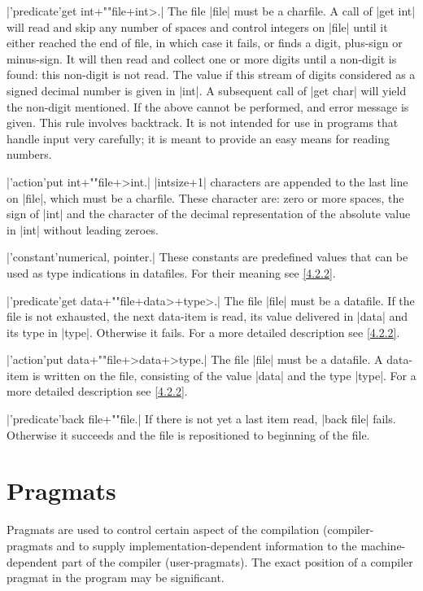 \documentclass{article}
\newcommand\g[1]{{\sf #1}}
\begin{document}
\X\pp|'predicate'get int+""file+int>.|\Y
The file \pp|file| must be a charfile. A call of \pp|get int| will read and
skip any number of spaces and control integers on \pp|file| until it either
reached the end of file, in which case it fails, or finds a digit, plus-sign
or minus-sign. It will then read and collect one or more digits until a
non-digit is found: this non-digit is not read. The value if this stream of
digits considered as a signed decimal number is given in \pp|int|.
A subsequent call of \pp|get char| will yield the non-digit mentioned. If
the above cannot be performed, and error message is given.
This rule involves backtrack. It is not intended for use in programs that
handle input very carefully; it is meant to provide an easy means for
reading numbers.

\X\pp|'action'put int+""file+>int.|\Y
\pp|intsize+1| characters are appended to the last line on \pp|file|, which
must be a charfile. These character are: zero or more spaces, the sign of
\pp|int| and the character of the decimal representation of the absolute
value in \pp|int| without leading zeroes.

\X\pp|'constant'numerical, pointer.|\Y
These constants are predefined values that can be used as type indications
in datafiles. For their meaning see \ref{4.2.2}.

\X\pp|'predicate'get data+""file+data>+type>.|\Y
The file \pp|file| must be a datafile. If the file is not exhausted, the
next data-item is read, its value delivered in \pp|data| and its type in
\pp|type|. Otherwise it fails. For a more detailed description see
\ref{4.2.2}.

\X\pp|'action'put data+""file+>data+>type.|\Y
The file \pp|file| must be a datafile. A data-item is written on the file,
consisting of the value \pp|data| and the type \pp|type|. For a more
detailed description see \ref{4.2.2}.

\X\pp|'predicate'back file+""file.|\Y
If there is not yet a last item read, \pp|back file| fails. Otherwise it
succeeds and the file is repositioned to
beginning of the file.


\section{Pragmats}\label{sec:6}

Pragmats are used to control certain aspect of the compilation
(\g{compiler-pragmats} and to supply implementation-dependent information to
the machine-dependent part of the compiler (\g{user-pragmats}). The exact
position of a compiler pragmat in the program may be significant.
\end{document}
